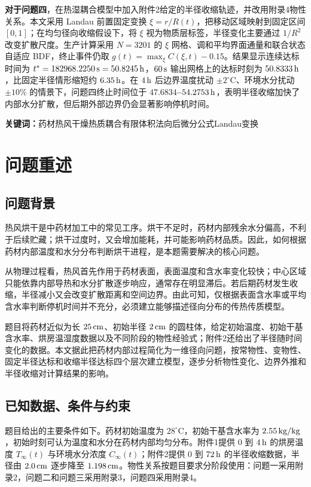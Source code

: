 \documentclass[UTF8,a4paper,12pt]{ctexart}
\numberwithin{equation}{section}
\begin{document}
\textbf{对于问题四}，在热湿耦合模型中加入附件2给定的半径收缩轨迹，并改用附录4物性关系。本文采用 Landau 前置固定变换 $\xi=r/R(t)$，把移动区域映射到固定区间 $[0,1]$；在均匀径向收缩假设下，将 $\xi$ 视为物质层标签，半径变化主要通过 $1/R^2$ 改变扩散尺度。生产计算采用 $N=3201$ 的 $\xi$ 网格、调和平均界面通量和联合状态自适应 BDF，终止事件仍取 $g(t)=\max_\xi C(\xi,t)-0.15$。结果显示连续达标时间为 \textbf{$t^*=182968.2250\rm\,s=50.8245\rm\,h$}，$60\rm\,s$ 输出网格上的达标时刻为 \textbf{$50.8333\rm\,h$}，比固定半径情形缩短约 $6.35\rm\,h$。在 $4\rm\,h$ 后边界温度扰动 $\pm2^\circ\mathrm C$、环境水分扰动 $\pm10\%$ 的情景下，问题四终止时间位于 \textbf{$47.6834$--$54.2753\rm\,h$}，表明半径收缩加快了内部水分扩散，但后期外部边界仍会显著影响停机时间。

\noindent \textbf{关键词：}药材热风干燥\quad 热质耦合\quad 有限体积法\quad 向后微分公式\quad Landau变换

\newpage
\section{问题重述}
\subsection{问题背景}
热风烘干是中药材加工中的常见工序。烘干不足时，药材内部残余水分偏高，不利于后续贮藏；烘干过度时，又会增加能耗，并可能影响药材品质。因此，如何根据药材内部温度和水分分布判断烘干进程，是本题需要解决的核心问题。

从物理过程看，热风首先作用于药材表面，表面温度和含水率变化较快；中心区域只能依靠内部导热和水分扩散逐步响应，通常存在明显滞后。若后期药材发生收缩，半径减小又会改变扩散距离和空间边界。由此可知，仅根据表面含水率或平均含水率判断停机时间并不充分，必须建立能够描述径向分布的传热传质模型。

题目将药材近似为长 $25\rm\,cm$、初始半径 $2\rm\,cm$ 的圆柱体，给定初始温度、初始干基含水率、烘房温湿度数据以及不同阶段的物性经验式；附件2还给出了半径随时间变化的数据。本文据此把药材内部过程简化为一维径向问题，按常物性、变物性、固定半径达标和收缩半径达标四个层次建立模型，逐步分析物性变化、边界外推和半径收缩对计算结果的影响。

\subsection{已知数据、条件与约束}
题目给出的主要条件如下。药材初始温度为 $28^\circ\mathrm C$，初始干基含水率为 $2.55\rm\,kg/kg$，初始时刻可认为温度和水分在药材内部均匀分布。附件1提供 $0$ 到 $4\rm\,h$ 的烘房温度 $T_\infty(t)$ 与环境水分浓度 $C_\infty(t)$；附件2提供 $0$ 到 $72\rm\,h$ 的半径收缩数据，半径由 $2.0\rm\,cm$ 逐步降至 $1.198\rm\,cm$。物性关系按题目要求分阶段使用：问题一采用附录2，问题二和问题三采用附录3，问题四采用附录4。
\end{document}
